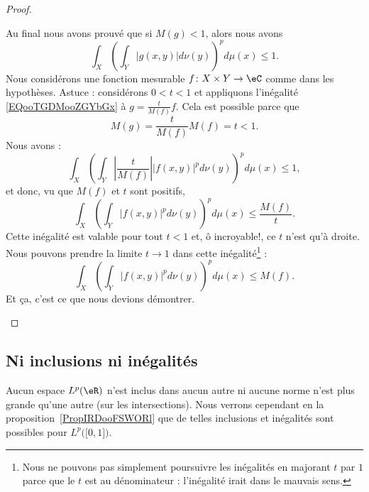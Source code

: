 \begin{proof}
\begin{subproof}
\begin{itemize}
		\end{itemize}
		Au final nous avons prouvé que si \( M(g)<1\), alors nous avons
		\begin{equation}        \label{EQooTGDMooZGYbGx}
			\int_X\left( \int_Y| g(x,y) |d\nu(y) \right)^pd\mu(x)\leq 1.
		\end{equation}
		Nous considérons une fonction mesurable \( f\colon X\times Y\to \eC\) comme dans les hypothèses. Astuce : considérons \( 0<t<1\) et appliquons l'inégalité \eqref{EQooTGDMooZGYbGx} à \( g=\frac{ t }{ M(f) }f\). Cela est possible parce que
		\begin{equation}
			M(g)=\frac{ t }{ M(f) }M(f)=t<1.
		\end{equation}
		Nous avons :
		\begin{equation}
			\int_X\left( \int_Y| \frac{ t }{ M(f) } | |f(x,y) |^pd\nu(y) \right)^pd\mu(x)\leq 1,
		\end{equation}
		et donc, vu que \( M(f)\) et \( t\) sont positifs,
		\begin{equation}
			\int_X\left( \int_Y| f(x,y) |^pd\nu(y) \right)^pd\mu(x)\leq \frac{ M(f) }{ t }.
		\end{equation}
		Cette inégalité est valable pour tout \( t<1\) et, ô incroyable!, ce \( t\) n'est qu'à droite. Nous pouvons prendre la limite \( t\to 1\) dans cette inégalité\footnote{Nous ne pouvons pas simplement poursuivre les inégalités en majorant \(  t\) par \(  1\) parce que le \(  t\) est au dénominateur : l'inégalité irait dans le mauvais sens.}  :
		\begin{equation}
			\int_X\left( \int_Y| f(x,y) |^pd\nu(y) \right)^pd\mu(x)\leq M(f).
		\end{equation}
		Et ça, c'est ce que nous devions démontrer.
	\end{subproof}

\end{proof}


\subsection{Ni inclusions ni inégalités}

Aucun espace \( L^p(\eR)\) n'est inclus dans aucun autre ni aucune norme n'est plus grande qu'une autre (sur les intersections). Nous verrons cependant en la proposition~\ref{PropIRDooFSWORl} que de telles inclusions et inégalités sont possibles pour \( L^p\big( \mathopen[ 0 , 1 \mathclose] \big)\).

